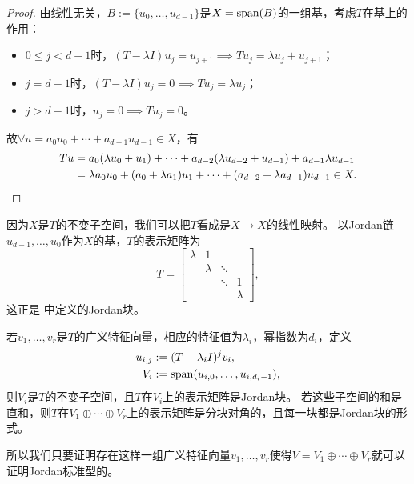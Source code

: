 \begin{proof}
	由线性无关，$B := \{u_0,\ldots,u_{d-1}\}$是$X = \operatorname{span}(B)$的一组基，考虑$T$在基上的作用：
	\begin{itemize}
		\item $0 \leq j < d - 1$时，$(T - \lambda I)u_j = u_{j+1} \implies Tu_j = \lambda u_j + u_{j+1}$；
		\item $j = d - 1$时，$(T - \lambda I)u_j = 0 \implies Tu_j = \lambda u_j$；
		\item $j > d - 1$时，$u_j = 0 \implies Tu_j = 0$。
	\end{itemize}
	故$\forall u = a_0u_0 + \cdots + a_{d-1}u_{d-1} \in X$，有
	\begin{align*}
		Tu &= a_0(\lambda u_0 + u_1) + \cdots + a_{d-2}(\lambda u_{d-2} + u_{d-1}) + a_{d-1}\lambda u_{d-1}\\
		&= \lambda a_0u_0 + (a_0 + \lambda a_1)u_1 + \cdots + (a_{d-2} + \lambda a_{d-1})u_{d-1} \in X.
		\qedhere
	\end{align*}
\end{proof}

\begin{corollary}
	因为$X$是$T$的不变子空间，我们可以把$T$看成是$X \to X$的线性映射。
	以Jordan链$u_{d-1},\ldots,u_0$作为$X$的基，$T$的表示矩阵为
	\[
		T = \begin{bmatrix}
			\lambda&1\\ &\lambda&\ddots\\ &&\ddots&1\\ &&&\lambda
		\end{bmatrix},
	\]
	这正是 中定义的Jordan块。
\end{corollary}

\begin{corollary}
	若$v_1,\ldots,v_r$是$T$的广义特征向量，相应的特征值为$\lambda_i$，幂指数为$d_i$，定义
	\begin{subequations}\label{eq:la-cyclic-subspace}
		\begin{align}
			u_{i,j} &:= (T - \lambda_iI)^jv_i,\\
			V_i &:= \operatorname{span}(u_{i,0},\ldots,u_{i,d_i-1}),
		\end{align}
	\end{subequations}
	则$V_i$是$T$的不变子空间，且$T$在$V_i$上的表示矩阵是Jordan块。
	若这些子空间的和是直和，则$T$在$V_1 \oplus \cdots \oplus V_r$上的表示矩阵是分块对角的，且每一块都是Jordan块的形式。

	所以我们只要证明存在这样一组广义特征向量$v_1,\ldots,v_r$使得$V = V_1 \oplus \cdots \oplus V_r$就可以证明Jordan标准型的。
\end{corollary}

